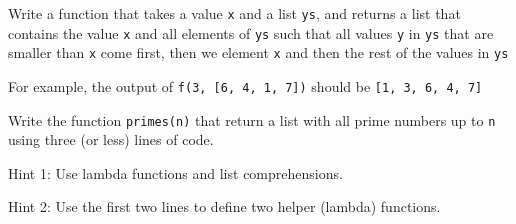 \begin{questions}


\label{sub:sorting}

Write a function that takes a value \texttt{x} and a list \texttt{ys},
and returns a list that contains the value \texttt{x} and all elements of \texttt{ys}
such that all values \texttt{y} in \texttt{ys} that are smaller than \texttt{x}
come first, then we element \texttt{x} and then the rest of the values in \texttt{ys}

For example, the output of
\texttt{f(3, [6, 4, 1, 7])} should be \texttt{[1, 3, 6, 4, 7]}


\label{sub:prime_challenge}

Write the function \texttt{primes(n)} that return a list with all prime numbers
up to \texttt{n} using three (or less) lines of code.

Hint 1: Use lambda functions and list comprehensions.

Hint 2: Use the first two lines to define two helper (lambda) functions.




\end{questions}

